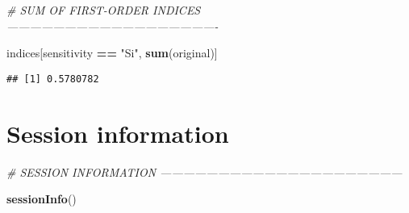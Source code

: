 \documentclass[11pt,]{article}
\newenvironment{Shaded}{\begin{snugshade}}{\end{snugshade}}
\newcommand{\CommentTok}[1]{\textcolor[rgb]{0.56,0.35,0.01}{\textit{#1}}}
\newcommand{\KeywordTok}[1]{\textcolor[rgb]{0.13,0.29,0.53}{\textbf{#1}}}
\newcommand{\NormalTok}[1]{#1}
\newcommand{\OperatorTok}[1]{\textcolor[rgb]{0.81,0.36,0.00}{\textbf{#1}}}
\newcommand{\StringTok}[1]{\textcolor[rgb]{0.31,0.60,0.02}{#1}}
\begin{document}
\begin{Shaded}
\begin{Highlighting}[]
\CommentTok{# SUM OF FIRST-ORDER INDICES -------------------------------------------------------}

\NormalTok{indices[sensitivity }\OperatorTok{==}\StringTok{ "Si"}\NormalTok{, }\KeywordTok{sum}\NormalTok{(original)]}
\end{Highlighting}
\end{Shaded}

\begin{verbatim}
## [1] 0.5780782
\end{verbatim}

\newpage

\hypertarget{session-information}{%
\section{Session information}\label{session-information}}

\begin{Shaded}
\begin{Highlighting}[]
\CommentTok{# SESSION INFORMATION ---------------------------------------------------------------}

\KeywordTok{sessionInfo}\NormalTok{()}
\end{Highlighting}
\end{Shaded}
\end{document}
